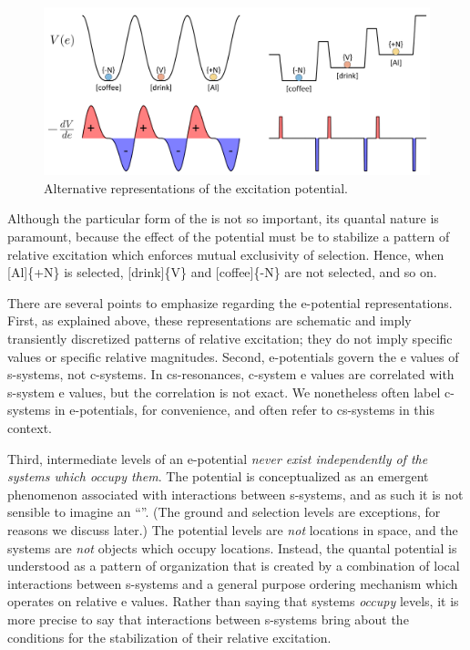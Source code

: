   
\begin{figure}
\includegraphics[width=\textwidth]{figures/Tilsen-img24.png}
\caption{Alternative representations of the excitation potential.}
\label{fig:2:17}
\end{figure}
 

  Although the particular form of the  is not so important, its quantal nature is paramount, because the effect of the potential must be to stabilize a pattern of relative excitation which enforces mutual exclusivity of selection. Hence, when [Al]\{+N\} is selected, [drink]\{V\} and [coffee]\{-N\} are not selected, and so on. 

  There are several points to emphasize regarding the e-potential representations. First, as explained above, these representations are schematic and imply transiently discretized patterns of relative excitation; they do not imply specific values or specific relative magnitudes. Second, e-potentials govern the e values of s-systems, not c-systems. In cs-resonances, c-system e values are correlated with s-system e values, but the correlation is not exact. We nonetheless often label c-systems in e-potentials, for convenience, and often refer to cs-systems in this context. 

  Third, intermediate levels of an e-potential \textit{never exist independently of the systems which occupy them}. The potential is conceptualized as an emergent phenomenon associated with interactions between s-systems, and as such it is not sensible to imagine an “”. (The ground and selection levels are exceptions, for reasons we discuss later.) The potential levels are \textit{not} locations in space, and the systems are \textit{not} objects which occupy locations. Instead, the quantal potential is understood as a pattern of organization that is created by a combination of local interactions between s-systems and a general purpose ordering mechanism which operates on relative e values. Rather than saying that systems \textit{occupy} levels, it is more precise to say that interactions between s-systems bring about the conditions for the stabilization of their relative excitation.

